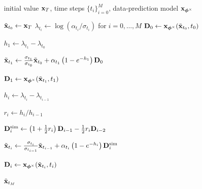 \begin{algorithm}[H]
    \centering
    \caption{DPM-Solver\texttt{++}(2M).}
    \label{alg:dpmpp-2m}
    \begin{algorithmic}[1]
    \Require initial value ${\mathbf{x}}_T$, time steps $\{t_i\}_{i=0}^M$,
    data-prediction model ${\mathbf{x}}_{{\bm{\phi}}^\times}$

    \State $\tilde{{\mathbf{x}}}_{t_0}\gets{\mathbf{x}}_T$
    \State $\lambda_{t_i}\gets\log(\alpha_{t_i}/\sigma_{t_i})$
    for $i=0,\ldots,M$
    \State
    ${\mathbf{D}}_0
    \gets
    {\mathbf{x}}_{{\bm{\phi}}^\times}
    (\tilde{{\mathbf{x}}}_{t_0},t_0)$

    \Statex
    \noindent{}

    \State
    $h_1
    \gets
    \lambda_{t_1}-\lambda_{t_0}$

    \State
    $\tilde{{\mathbf{x}}}_{t_1}
    \gets
    \tfrac{\sigma_{t_1}}{\sigma_{t_0}}
    \tilde{{\mathbf{x}}}_{t_0}
    +
    \alpha_{t_1}
    \left(
    1-e^{-h_1}
    \right)
    {\mathbf{D}}_0$

        \State
        ${\mathbf{D}}_1
        \gets
        {\mathbf{x}}_{{\bm{\phi}}^\times}
        (\tilde{{\mathbf{x}}}_{t_1},t_1)$
    \EndIf

    \Statex
    \noindent{}

        \State
        $h_i
        \gets
        \lambda_{t_i}-\lambda_{t_{i-1}}$

        \State
        $r_i
        \gets
        h_i/h_{i-1}$

        \State
        ${\mathbf{D}}_i^{\mathrm{sim}}
        \gets
        \left(
        1+\tfrac12 r_i
        \right)
        {\mathbf{D}}_{i-1}
        -
        \tfrac12 r_i
        {\mathbf{D}}_{i-2}$

        \State
        $\tilde{{\mathbf{x}}}_{t_i}
        \gets
        \tfrac{\sigma_{t_i}}{\sigma_{t_{i-1}}}
        \tilde{{\mathbf{x}}}_{t_{i-1}}
        +
        \alpha_{t_i}
        \left(
        1-e^{-h_i}
        \right)
        {\mathbf{D}}_i^{\mathrm{sim}}$

            \State
            ${\mathbf{D}}_i
            \gets
            {\mathbf{x}}_{{\bm{\phi}}^\times}
            (\tilde{{\mathbf{x}}}_{t_i},t_i)$
        \EndIf
    \EndFor

    \State \Return $\tilde{{\mathbf{x}}}_{t_M}$
    \end{algorithmic}
\end{algorithm}

